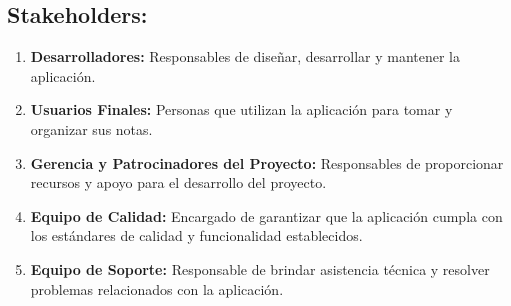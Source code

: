 \subsection{Stakeholders:}
\begin{enumerate}
    \item \textbf{Desarrolladores:} Responsables de diseñar, desarrollar y mantener la aplicación.
    \item \textbf{Usuarios Finales:} Personas que utilizan la aplicación para tomar y organizar sus notas.
    \item \textbf{Gerencia y Patrocinadores del Proyecto:} Responsables de proporcionar recursos y apoyo para el desarrollo del proyecto.
    \item \textbf{Equipo de Calidad:} Encargado de garantizar que la aplicación cumpla con los estándares de calidad y funcionalidad establecidos.
    \item \textbf{Equipo de Soporte:} Responsable de brindar asistencia técnica y resolver problemas relacionados con la aplicación.
\end{enumerate}